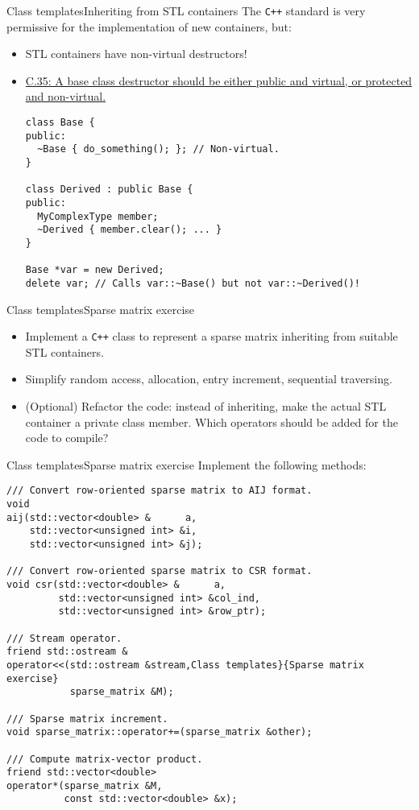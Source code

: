 \documentclass[9pt]{beamer}
\begin{document}
\begin{frame}[fragile]{Class templates}{Inheriting from STL containers}
The \texttt{C++} standard is very permissive for the implementation of new containers, but:
\begin{itemize}
\item STL containers have non-virtual destructors!
\item \href{http://isocpp.github.io/CppCoreGuidelines/CppCoreGuidelines\#Rc-dtor-virtual}{C.35: A base class destructor should be either public and virtual, or protected and non-virtual.}
\small\begin{lstlisting}
class Base {
public:
  ~Base { do_something(); }; // Non-virtual.
}

class Derived : public Base {
public:
  MyComplexType member;
  ~Derived { member.clear(); ... }
}

Base *var = new Derived;
delete var; // Calls var::~Base() but not var::~Derived()!
\end{lstlisting}\normalsize
\end{itemize}
\end{frame}


\begin{frame}[fragile]{Class templates}{Sparse matrix exercise}
\begin{itemize}
\item Implement a \texttt{C++} class to represent a sparse matrix inheriting from suitable STL containers.
\item Simplify random access, allocation, entry increment, sequential traversing.
\item (Optional) Refactor the code: instead of inheriting, make the actual STL container a private class member. Which operators should be added for the code to compile?
\end{itemize}
\end{frame}


\begin{frame}[fragile]{Class templates}{Sparse matrix exercise}
Implement the following methods:
\begin{lstlisting}[basicstyle=\footnotesize]
/// Convert row-oriented sparse matrix to AIJ format.
void
aij(std::vector<double> &      a,
    std::vector<unsigned int> &i,
    std::vector<unsigned int> &j);

/// Convert row-oriented sparse matrix to CSR format.
void csr(std::vector<double> &      a,
         std::vector<unsigned int> &col_ind,
         std::vector<unsigned int> &row_ptr);

/// Stream operator.
friend std::ostream &
operator<<(std::ostream &stream,Class templates}{Sparse matrix exercise}
           sparse_matrix &M);

/// Sparse matrix increment.
void sparse_matrix::operator+=(sparse_matrix &other);

/// Compute matrix-vector product.
friend std::vector<double>
operator*(sparse_matrix &M,
          const std::vector<double> &x);
\end{lstlisting}
\end{frame}
\end{document}
